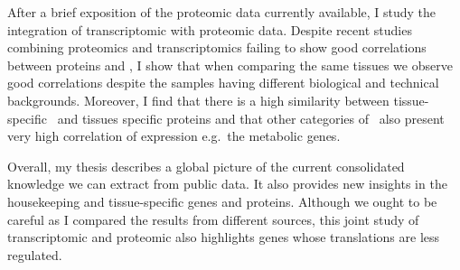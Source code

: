 \begin{singlespace}
\begin{small}
        After a brief exposition of the proteomic data currently available, I
        study the integration of transcriptomic with proteomic data. Despite
        recent studies combining proteomics and transcriptomics failing to show
        good correlations between proteins and \mRNAs, I show that when comparing
        the same tissues we observe good correlations despite the samples having
        different biological and technical backgrounds. Moreover, I find that
        there is a high similarity between tissue-specific \mRNAs\ and tissues
        specific proteins and that other categories of \mRNAs\ also present very
        high correlation of expression e.g.\ the metabolic genes.

        Overall, my thesis describes a global picture of the current consolidated
        knowledge we can extract from public data. It also provides new insights
        in the housekeeping and tissue-specific genes and proteins. Although we
        ought to be careful as I compared the results from different sources,
        this joint study of transcriptomic and proteomic also highlights genes
        whose translations are less regulated.
    \end{small}
\end{singlespace}

